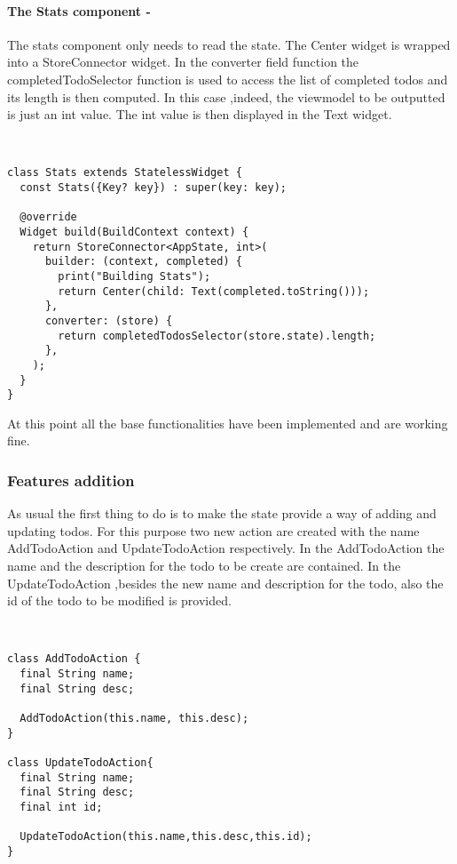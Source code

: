 \paragraph{The Stats component - }
\label{subpar:todo_app_bloc_core_state}
The stats component only needs to read the state. The Center widget is wrapped into a StoreConnector widget. In the converter field function the completedTodoSelector function is used to access the list of completed todos and its length is then computed. In this case ,indeed, the viewmodel to be outputted is just an int value. The int value is then displayed in the Text widget.
\begin{code}
\mbox{}\\
 \mbox{}
		\label{code:2.14}
\begin{verbatim}
class Stats extends StatelessWidget {
  const Stats({Key? key}) : super(key: key);

  @override
  Widget build(BuildContext context) {
    return StoreConnector<AppState, int>(
      builder: (context, completed) {
        print("Building Stats");
        return Center(child: Text(completed.toString()));
      },
      converter: (store) {
        return completedTodosSelector(store.state).length;
      },
    );
  }
}
\end{verbatim}
\mbox{}
\end{code}

At this point all the base functionalities have been implemented and are working fine.
 

\subsubsection{Features addition}  \label{par:todo_app_inherited_widget_introduction}

As usual the first thing to do is to make the state provide a way of adding and updating todos. For this purpose two new action are created with the name AddTodoAction and UpdateTodoAction respectively. In the AddTodoAction the name and the description for the todo to be create are contained. In the UpdateTodoAction ,besides the new name and description for the todo, also the id of the todo to be modified is provided.
\begin{code}
\mbox{}\\
 \mbox{}
		\label{code:2.14}
\begin{verbatim}
class AddTodoAction {
  final String name;
  final String desc;

  AddTodoAction(this.name, this.desc);
}

class UpdateTodoAction{
  final String name;
  final String desc;
  final int id;

  UpdateTodoAction(this.name,this.desc,this.id);
}
\end{verbatim}
\mbox{}
\end{code}

